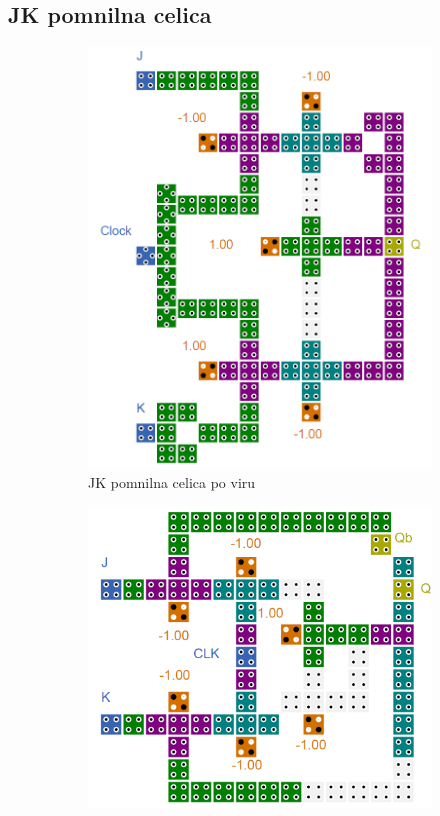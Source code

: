 \documentclass[a4paper, 11pt]{article}
\begin{document}
\subsection{JK pomnilna celica}
\begin{figure}[h!]
	\begin{subfigure}[b]{0.4\textwidth}
	\includegraphics[width=\textwidth]{../img/vir_4/jk.png}
	\caption{JK pomnilna celica po viru \cite{quantum_dot}}
	\label{fig-jk-1}
	\end{subfigure}
	\begin{subfigure}[b]{0.4\textwidth}
	\includegraphics[width=\textwidth]{../img/vir_5/jk.png} 

\end{subfigure}
\end{figure}
\end{document}
